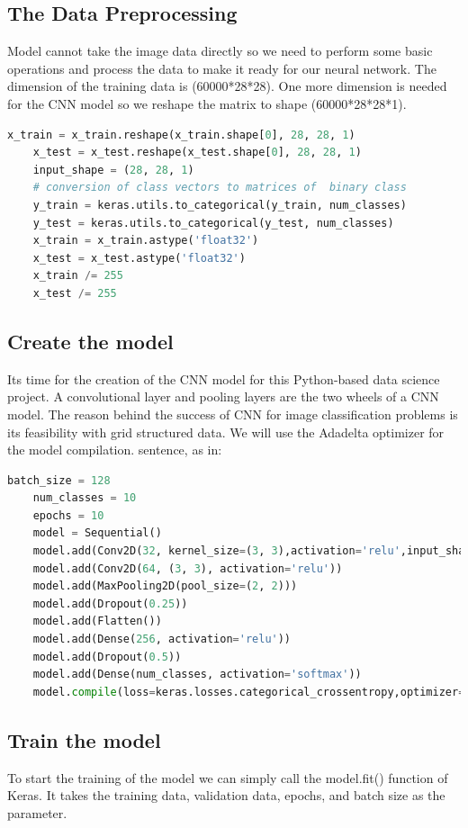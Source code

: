 \documentclass[conference]{IEEEtran}
\begin{document}
\subsection{The Data Preprocessing}
Model cannot take the image data directly so we need to perform some basic operations and process the data to make it ready for our neural network. The dimension of the training data is (60000*28*28). One more dimension is needed for the CNN model so we reshape the matrix to shape (60000*28*28*1).
\begin{lstlisting}[language=Python, caption=Import libraries and datasets]
    x_train = x_train.reshape(x_train.shape[0], 28, 28, 1)
    x_test = x_test.reshape(x_test.shape[0], 28, 28, 1)
    input_shape = (28, 28, 1)
    # conversion of class vectors to matrices of  binary class 
    y_train = keras.utils.to_categorical(y_train, num_classes)
    y_test = keras.utils.to_categorical(y_test, num_classes)
    x_train = x_train.astype('float32')
    x_test = x_test.astype('float32')
    x_train /= 255
    x_test /= 255
\end{lstlisting}

\subsection{Create the model}
Its time for the creation of the CNN model for this Python-based data science project. A convolutional layer and pooling layers are the two wheels of a CNN model. The reason behind the success of CNN for image classification problems is its feasibility with grid structured data. We will use the Adadelta optimizer for the model compilation.
sentence, as in:
\begin{lstlisting}[language=Python, caption=Import libraries and datasets]
    batch_size = 128
    num_classes = 10
    epochs = 10
    model = Sequential()
    model.add(Conv2D(32, kernel_size=(3, 3),activation='relu',input_shape=input_shape))
    model.add(Conv2D(64, (3, 3), activation='relu'))
    model.add(MaxPooling2D(pool_size=(2, 2)))
    model.add(Dropout(0.25))
    model.add(Flatten())
    model.add(Dense(256, activation='relu'))
    model.add(Dropout(0.5))
    model.add(Dense(num_classes, activation='softmax'))
    model.compile(loss=keras.losses.categorical_crossentropy,optimizer=keras.optimizers.Adadelta(),metrics=['accuracy'])
\end{lstlisting}

\subsection{Train the model}
To start the training of the model we can simply call the model.fit() function of Keras. It takes the training data, validation data, epochs, and batch size as the parameter.
\end{document}

